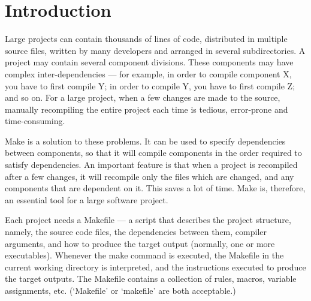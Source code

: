 \documentclass[output=paper, 
colorlinks,
citecolor=brown,
newtxmath
]{langscibook}
\begin{document}

\def\maketitle{

 \makeatletter
 {\color{bl} \centering \huge \sc \textbf{
\large \vspace*{-8pt} \color{black} Programación de Sistemas Embebidos
 \vspace*{8pt} }\par}
 \makeatother


 \makeatletter
 {\centering \small 
 	Departamento de Ingeniería de Computadoras \\
 	Facultad de Informática - Universidad Nacional del Comahue \\
 	\vspace{20pt} }
 \makeatother

}










\section {Introduction}


Large projects can contain thousands of lines of code, distributed in multiple source files, written by many developers and arranged in several subdirectories. A project may contain several component divisions. These components may have complex inter-dependencies — for example, in order to compile component X, you have to first compile Y; in order to compile Y, you have to first compile Z; and so on. For a large project, when a few changes are made to the source, manually recompiling the entire project each time is tedious, error-prone and time-consuming.

Make is a solution to these problems. It can be used to specify dependencies between components, so that it will compile components in the order required to satisfy dependencies. An important feature is that when a project is recompiled after a few changes, it will recompile only the files which are changed, and any components that are dependent on it. This saves a lot of time. Make is, therefore, an essential tool for a large software project.

Each project needs a Makefile — a script that describes the project structure, namely, the source code files, the dependencies between them, compiler arguments, and how to produce the target output (normally, one or more executables). Whenever the make command is executed, the Makefile in the current working directory is interpreted, and the instructions executed to produce the target outputs. The Makefile contains a collection of rules, macros, variable assignments, etc. (‘Makefile’ or ‘makefile’ are both acceptable.)
\end{document}
